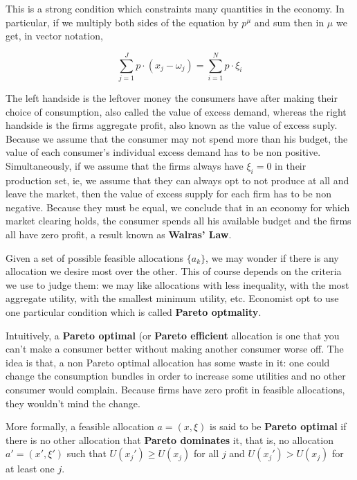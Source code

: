 This is a strong condition which constraints many quantities in the economy. In particular, if we multiply both sides of the equation by $p^\mu$ and sum then in $\mu$ we get, in vector notation,

\begin{equation}
  \label{eq:price_market_clearing}
  \sum_{j = 1}^J p \cdot (x_j - \omega_j) = \sum_{i=1}^N p\cdot \xi_i
\end{equation}

The left handside is the leftover money the consumers have after making their choice of consumption, also called the value of excess demand, whereas the right handside is the firms aggregate profit, also known as the value of excess suply. Because we assume that the consumer may not spend more than his budget, the value of each consumer's individual excess demand has to be non positive. Simultaneously, if we assume that the firms always have $\xi_i = 0$ in their production set, ie, we assume that they can always opt to not produce at all and leave the market, then the value of excess supply for each firm has to be non negative. Because they must be equal, we conclude that in an economy for which market clearing holds, the consumer spends all his available budget and the firms all have zero profit, a result known as \textbf{Walras' Law}. 

Given a set of possible feasible allocations $\{a_k\}$, we may wonder if there is any allocation we desire most over the other. This of course depends on the criteria we use to judge them: we may like allocations with less inequality, with the most aggregate utility, with the smallest minimum utility, etc. Economist opt to use one particular condition which is called \textbf{Pareto optmality}.

Intuitively, a \textbf{Pareto optimal} (or \textbf{Pareto efficient} allocation is one that you can't make a consumer better without making another consumer worse off. The idea is that, a non Pareto optimal allocation has some waste in it: one could change the consumption bundles in order to increase some utilities and no other consumer would complain. Because firms have zero profit in feasible allocations, they wouldn't mind the change. 

More formally, a feasible allocation $a = (x, \xi)$ is said to be \textbf{Pareto optimal} if there is no other allocation that \textbf{Pareto dominates} it, that is, no allocation $a' = (x', \xi')$ such that $U(x_j') \geq U(x_j)$ for all $j$ and $U(x_j') > U(x_j)$ for at least one $j$.

